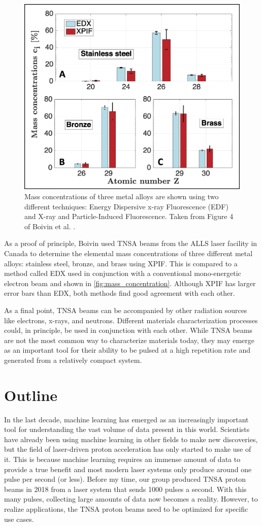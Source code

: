 \begin{figure}
	\centering
	\includegraphics[width=0.6\linewidth]{planning/images/mass_concentration.jpg}
	\caption{Mass concentrations of three metal alloys are shown using two different techniques: Energy Dispersive x-ray Fluorescence (EDF) and X-ray and Particle-Induced Fluorescence. Taken from Figure 4 of Boivin et al. \cite{Boivin_2022_NJoP}.}
	\label{fig:mass_concentration}
\end{figure}

As a proof of principle, Boivin \cite{Boivin_2022_NJoP} used TNSA beams from the \gls{ALLS} laser facility in Canada to determine the elemental mass concentrations of three different metal alloys: stainless steel, bronze, and  brass using \gls{XPIF}. This is compared to a method called \gls{EDX} used in conjunction with a conventional mono-energetic electron beam and shown in \autoref{fig:mass_concentration}. Although XPIF has larger error bars than \gls{EDX}, both methods find good agreement with each other.

As a final point, \gls{TNSA} beams can be accompanied by other radiation sources like electrons, x-rays, and neutrons. Different materials characterization processes could, in principle, be used in conjunction with each other. While \gls{TNSA} beams are not the most common way to characterize materials today, they may emerge as an important tool for their ability to be pulsed at a high repetition rate and generated from a relatively compact system.

\section{Outline}
In the last decade, machine learning has emerged as an increasingly important tool for understanding the vast volume of data present in this world. Scientists have already been using machine learning in other fields to make new discoveries, but the field of laser-driven proton acceleration has only started to make use of it. This is because machine learning requires an immense amount of data to provide a true benefit \cite{Dopp_2023_HPLSE} and most modern laser systems only produce around one pulse per second (or less). Before my time, our group produced \gls{TNSA} proton beams in 2018 \cite{Morrison_2018_NJoP} from a laser system that sends 1000 pulses a second. With this many pulses, collecting large amounts of data now becomes a reality. However, to realize applications, the \gls{TNSA} proton beams need to be optimized for specific use cases. 

